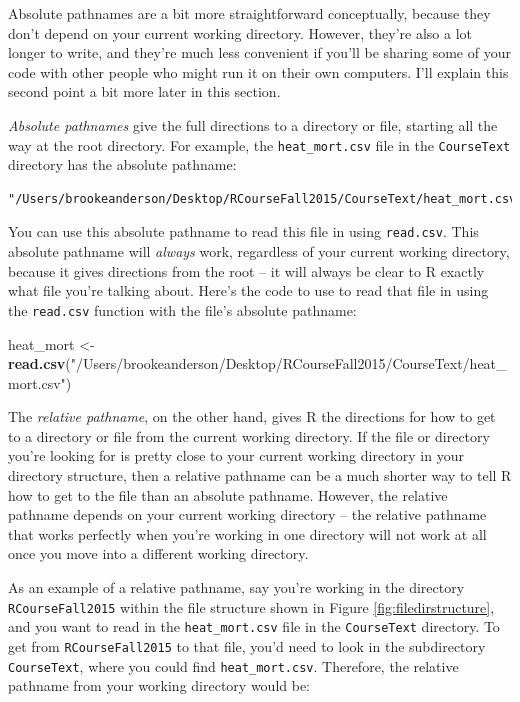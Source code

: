 \documentclass[]{book}
\makeatletter
\newenvironment{Shaded}{\begin{snugshade}}{\end{snugshade}}
\newcommand{\KeywordTok}[1]{\textcolor[rgb]{0.13,0.29,0.53}{\textbf{#1}}}
\newcommand{\StringTok}[1]{\textcolor[rgb]{0.31,0.60,0.02}{#1}}
\newcommand{\NormalTok}[1]{#1}
\newenvironment{kframe}{%
\medskip{}
\setlength{\fboxsep}{.8em}
 \def\at@end@of@kframe{}%
 \ifinner\ifhmode%
  \def\at@end@of@kframe{\end{minipage}}%
  \begin{minipage}{\columnwidth}%
 \fi\fi%
 \def\FrameCommand##1{\hskip\@totalleftmargin \hskip-\fboxsep
 \colorbox{shadecolor}{##1}\hskip-\fboxsep
     \hskip-\linewidth \hskip-\@totalleftmargin \hskip\columnwidth}%
 \MakeFramed {\advance\hsize-\width
   \@totalleftmargin\z@ \linewidth\hsize
   \@setminipage}}%
 {\par\unskip\endMakeFramed%
 \at@end@of@kframe}
\renewenvironment{Shaded}{\begin{kframe}}{\end{kframe}}
\theoremstyle{definition}
\theoremstyle{definition}
\theoremstyle{definition}
\theoremstyle{remark}
\makeatother
\begin{document}
Absolute pathnames are a bit more straightforward conceptually, because
they don't depend on your current working directory. However, they're
also a lot longer to write, and they're much less convenient if you'll
be sharing some of your code with other people who might run it on their
own computers. I'll explain this second point a bit more later in this
section.

\emph{Absolute pathnames} give the full directions to a directory or
file, starting all the way at the root directory. For example, the
\texttt{heat\_mort.csv} file in the \texttt{CourseText} directory has
the absolute pathname:

\begin{verbatim}
"/Users/brookeanderson/Desktop/RCourseFall2015/CourseText/heat_mort.csv"
\end{verbatim}

You can use this absolute pathname to read this file in using
\texttt{read.csv}. This absolute pathname will \emph{always} work,
regardless of your current working directory, because it gives
directions from the root -- it will always be clear to R exactly what
file you're talking about. Here's the code to use to read that file in
using the \texttt{read.csv} function with the file's absolute pathname:

\begin{Shaded}
\begin{Highlighting}[]
\NormalTok{heat_mort <-}\StringTok{ }\KeywordTok{read.csv}\NormalTok{(}\StringTok{"/Users/brookeanderson/Desktop/RCourseFall2015/CourseText/heat_mort.csv"}\NormalTok{)}
\end{Highlighting}
\end{Shaded}

The \emph{relative pathname}, on the other hand, gives R the directions
for how to get to a directory or file from the current working
directory. If the file or directory you're looking for is pretty close
to your current working directory in your directory structure, then a
relative pathname can be a much shorter way to tell R how to get to the
file than an absolute pathname. However, the relative pathname depends
on your current working directory -- the relative pathname that works
perfectly when you're working in one directory will not work at all once
you move into a different working directory.

As an example of a relative pathname, say you're working in the
directory \texttt{RCourseFall2015} within the file structure shown in
Figure \ref{fig:filedirstructure}, and you want to read in the
\texttt{heat\_mort.csv} file in the \texttt{CourseText} directory. To
get from \texttt{RCourseFall2015} to that file, you'd need to look in
the subdirectory \texttt{CourseText}, where you could find
\texttt{heat\_mort.csv}. Therefore, the relative pathname from your
working directory would be:
\end{document}
